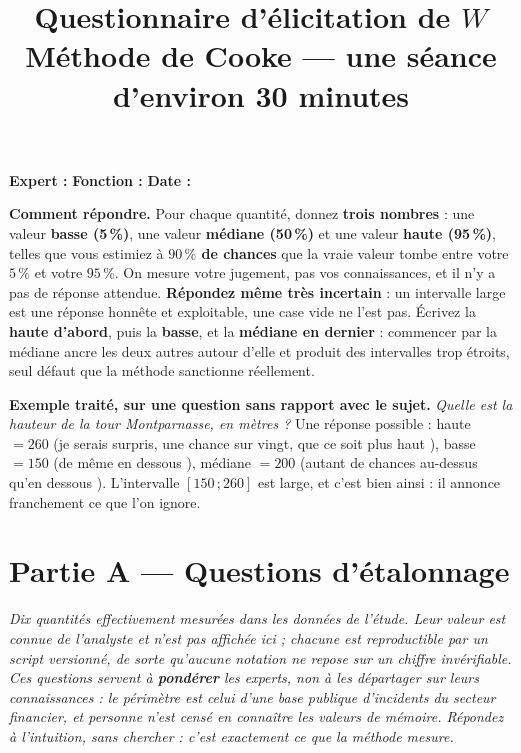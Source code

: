 \documentclass[11pt,a4paper]{article}
\title{\vspace{-1.3cm}\color{navy}\bfseries Questionnaire d'élicitation de $W$\\[2pt]
  \large Méthode de Cooke --- une séance d'environ 30 minutes}
\date{}
\begin{document}
\maketitle
\thispagestyle{fancy}   %
\vspace{-1.4cm}

\noindent\textbf{Expert :} \underline{\hspace{4.2cm}} \quad
\textbf{Fonction :} \underline{\hspace{4.2cm}} \quad
\textbf{Date :} \underline{\hspace{2.6cm}}

\vspace{0.25cm}
\begin{cle}
\textbf{Comment répondre.} Pour chaque quantité, donnez \textbf{trois nombres} : une valeur
\textbf{basse (5\,\%)}, une valeur \textbf{médiane (50\,\%)} et une valeur \textbf{haute
(95\,\%)}, telles que vous estimiez à \textbf{$90\,\%$ de chances} que la vraie valeur tombe
entre votre $5\,\%$ et votre $95\,\%$. On mesure votre jugement, pas vos connaissances, et il
n'y a pas de réponse attendue. \textbf{Répondez même très incertain} : un intervalle large est
une réponse honnête et exploitable, une case vide ne l'est pas. Écrivez la \textbf{haute
d'abord}, puis la \textbf{basse}, et la \textbf{médiane en dernier} : commencer par la médiane
ancre les deux autres autour d'elle et produit des intervalles trop étroits, seul défaut que la
méthode sanctionne réellement.
\end{cle}

\vspace{0.2cm}
\begin{mention}
\footnotesize
\textbf{Exemple traité, sur une question sans rapport avec le sujet.} \emph{Quelle est la
hauteur de la tour Montparnasse, en mètres ?} Une réponse possible : haute $=260$
(\og je serais surpris, une chance sur vingt, que ce soit plus haut \fg), basse $=150$
(\og de même en dessous \fg), médiane $=200$ (\og autant de chances au-dessus qu'en
dessous \fg). L'intervalle $[150\,;260]$ est large, et c'est bien ainsi : il annonce
franchement ce que l'on ignore.
\end{mention}

\section*{Partie A --- Questions d'étalonnage}
\footnotesize\emph{Dix quantités effectivement mesurées dans les données de l'étude. Leur
valeur est connue de l'analyste et n'est pas affichée ici ; chacune est reproductible par un
script versionné, de sorte qu'aucune notation ne repose sur un chiffre invérifiable. Ces
questions servent à \textbf{pondérer} les experts, non à les départager sur leurs
connaissances : le périmètre est celui d'une base publique d'incidents du secteur financier,
et personne n'est censé en connaître les valeurs de mémoire. Répondez à l'intuition, sans
chercher : c'est exactement ce que la méthode mesure.}
\normalsize
\end{document}
